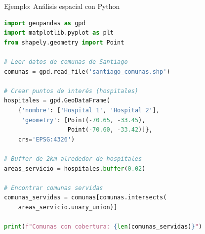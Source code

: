 \documentclass[10pt]{beamer}
\begin{document}
\begin{frame}[fragile]{Ejemplo: Análisis espacial con Python}
    \begin{lstlisting}[language=Python]
import geopandas as gpd
import matplotlib.pyplot as plt
from shapely.geometry import Point

# Leer datos de comunas de Santiago
comunas = gpd.read_file('santiago_comunas.shp')

# Crear puntos de interés (hospitales)
hospitales = gpd.GeoDataFrame(
    {'nombre': ['Hospital 1', 'Hospital 2'],
     'geometry': [Point(-70.65, -33.45), 
                  Point(-70.60, -33.42)]},
    crs='EPSG:4326')

# Buffer de 2km alrededor de hospitales
areas_servicio = hospitales.buffer(0.02)

# Encontrar comunas servidas
comunas_servidas = comunas[comunas.intersects(
    areas_servicio.unary_union)]

print(f"Comunas con cobertura: {len(comunas_servidas)}")
    \end{lstlisting}
\end{frame}
\end{document}
